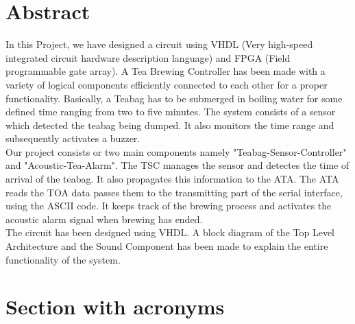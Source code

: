 \documentclass[12pt,a4paper]{article}
\begin{document}
\newpage
\section*{Abstract}
In this Project, we have designed a circuit using VHDL (Very high-speed integrated circuit hardware description language) and FPGA (Field programmable gate array). A Tea Brewing Controller has been made with a variety of logical components efficiently connected to each other for a proper functionality. Basically, a Teabag has to be submerged in boiling water for some defined time ranging from two to five minutes. The system consists of a sensor which detected the teabag being dumped. It also monitors the time range and subsequently activates a buzzer. \\

Our project consists or two main components namely "Teabag-Sensor-Controller" and "Acoustic-Tea-Alarm". The TSC manages the sensor and detectes the time of arrival of the teabag. It also propagates this information to the ATA. The ATA reads the TOA data passes them to the transmitting part of the serial interface, using the ASCII code. It keeps track of the brewing process and activates the acoustic alarm signal when brewing has ended. \\

The circuit has been designed using VHDL. A block diagram of the Top Level Architecture and the Sound Component has been made to explain the entire functionality of the system. \\





\newpage
\pagestyle{fancy}
\fancyfoot{}
\fancyhead{}
\setlength{\footskip=25pt}
\setlength{\headheight=0pt}

\fancyfoot{}
\newpage

\setcounter{page}{5}
\tableofcontents
\clearpage

\section*{Section with acronyms}



\printglossary[type=\acronymtype]


\listoffigures
\clearpage
\end{document}
